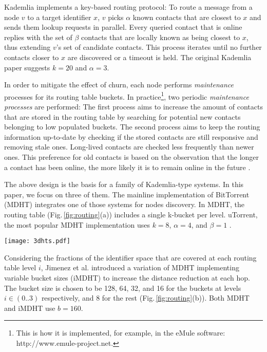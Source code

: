 \documentclass[10pt, conference, compsocconf, letterpaper]{IEEEtran}
\begin{document}
Kademlia implements a key-based routing protocol: To route a message from a node $v$ to a target identifier $x$, $v$ picks $\alpha$ known contacts that are closest to $x$ and sends them lookup requests in parallel. Every queried contact that is online replies with the set of $\beta$ contacts that are locally known as being closest to $x$, thus extending $v$'s set of candidate contacts. This process iterates until no further contacts closer to $x$ are discovered or a timeout is held. The original Kademlia paper suggests $k=20$ and $\alpha=3$.

In order to mitigate the effect of churn, each node performs \emph{maintenance} processes for its routing table buckets. In practice\footnote{This is how it is implemented, for example, in the eMule software: http://www.emule-project.net.}, two periodic \emph{maintenance processes} are performed: The first process aims to increase the amount of contacts that are stored in the routing table by searching for potential new contacts belonging to low populated buckets. The second process aims to keep the routing information up-to-date by checking if the stored contacts are still responsive and removing stale ones. Long-lived contacts are checked less frequently than newer ones. This preference for old contacts is based on the observation that the longer a contact has been online, the more likely it is to remain online in the future \cite{saroiu01measur, Maymounkov02Kademlia}. 

The above design is the basis for a family of Kademlia-type systems. In this paper, we focus on three of them.  The mainline implementation of BitTorrent (MDHT) integrates one of those systems for nodes discovery. In MDHT, the routing table (Fig.\,\ref{fig:routing}(a)) includes a single k-bucket per level. uTorrent, the most popular MDHT implementation uses $k=8$, $\alpha=4$, and $\beta=1$ \cite{Jimenez2011subsecond}. 

\begin{figure*} \centering
\captionsetup{font=scriptsize}
      \texttt{[image: 3dhts.pdf]}
   \caption{The routing table structures of three Kademlia-type systems (adapted from: \cite{wang08attacking}): (a) MDHT, (b) iMDHT, and (c) KAD.}
\label{fig:routing}
\end{figure*} 

Considering the fractions of the identifier space that are covered at each routing table level $i$, Jimenez et al. \cite{Jimenez2011subsecond} introduced a variation of MDHT implementing variable bucket sizes (iMDHT) to increase the distance reduction at each hop. The bucket size is chosen to be 128, 64, 32, and 16 for the buckets at levels $i \in (0..3)$ respectively, and 8 for the rest (Fig.\,\ref{fig:routing}(b)). Both MDHT and iMDHT use $b=160$.
\end{document}
